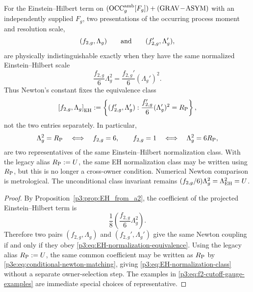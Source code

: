\documentclass[12pt,a4paper]{article}
\begin{document}
\begin{theorem}
\label{p3:thm:EH-normalization-gauge}
For the Einstein--Hilbert term on
\((\mathrm{OCC}_{g}^{\rm amb}[F_g])+(\mathrm{GRAV\!-\!ASYM})\) with an
independently supplied \(F_g\), two
presentations of the occurring process moment and resolution scale,
\[
(f_{2,g},\Lambda_g)\qquad\hbox{and}\qquad
(f_{2,g}',\Lambda_g'),
\]
are physically indistinguishable exactly when they have the same normalized
Einstein--Hilbert scale
\begin{equation}
\label{p3:eq:EH-normalization-equivalence}
\frac{f_{2,g}}{6}\Lambda_g^2
=\frac{f_{2,g}'}{6}(\Lambda_g')^2.
\end{equation}
Thus Newton's constant fixes the equivalence class
\begin{equation}
\label{p3:eq:EH-normalization-class}
\left[ f_{2,g},\Lambda_g\right]_{\rm EH}
:=\left\{(f_{2,g}',\Lambda_g'):
\frac{f_{2,g}'}6(\Lambda_g')^2=R_{\mathrm P}\right\},
\end{equation}
not the two entries separately.  In particular,
\begin{equation}
\label{p3:eq:f2-cutoff-gauge-examples}
\Lambda_g^2=R_{\mathrm P}\quad\Longleftrightarrow\quad f_{2,g}=6,
\qquad
f_{2,g}=1\quad\Longleftrightarrow\quad \Lambda_g^2=6R_{\mathrm P},
\end{equation}
are two representatives of the same Einstein--Hilbert normalization class.
With the legacy alias \(R_{\mathrm P}:=U\), the same EH normalization class may be
written using \(R_{\mathrm P}\), but this is no longer a cross-owner condition.  Numerical
Newton comparison is metrological.  The unconditional class invariant remains
\((f_{2,g}/6)\Lambda_g^2=\Lambda_{\rm EH}^2=U\).
\end{theorem}

\begin{proof}
By Proposition~\ref{p3:prop:EH_from_a2}, the coefficient of the projected
Einstein--Hilbert term is
\[
\frac18\left(\frac{f_{2,g}}{6}\Lambda_g^2\right).
\]
Therefore two pairs \((f_{2,g},\Lambda_g)\) and
\((f_{2,g}',\Lambda_g')\) give the same Newton
coupling if and only if they obey \eqref{p3:eq:EH-normalization-equivalence}.
Using the legacy alias \(R_{\mathrm P}:=U\), the same common coefficient may be written
as \(R_{\mathrm P}\) by \eqref{p3e:eq:conditional-newton-matching}, giving
\eqref{p3:eq:EH-normalization-class} without a separate owner-selection step.
The examples in \eqref{p3:eq:f2-cutoff-gauge-examples} are immediate special
choices of representative.
\end{proof}
\end{document}
